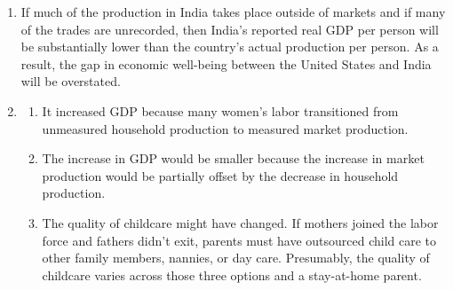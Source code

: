 \documentclass{article}
\begin{document}
\begin{enumerate}
\begin{enumerate}
	\item $100 \left[ \left( \frac{113.6}{78.1} \right)^{\frac{1}{20}} - 1 \right] = 1.89 \%$
	
	\item $\frac{10,287}{\frac{78.1}{100}} = 13,171.57$
	
	\item $\frac{21,141}{\frac{113.5}{100}} = 18,610.04$	
	
	\item $100 \left[ \left( \frac{18610.04}{13171.57} \right)^{\frac{1}{20}} - 1 \right] = 1.74$
	
	\item It must be higher because it also includes growth in prices.
	
	\end{enumerate}
	
\setcounter{enumi}{9}
\item If much of the production in India takes place outside of markets and if many of the trades are unrecorded, then India's reported real GDP per person will be substantially lower than the country's actual production per person. As a result, the gap in economic well-being between the United States and India will be overstated.

\item

	\begin{enumerate}
	
	\item It increased GDP because many women's labor transitioned from unmeasured household production to measured market production.
	
	\item The increase in GDP would be smaller because the increase in market production would be partially offset by the decrease in household production.
	
	\item The quality of childcare might have changed. If mothers joined the labor force and fathers didn't exit, parents must have outsourced child care to other family members, nannies, or day care. Presumably, the quality of childcare varies across those three options and a stay-at-home parent.
	
	\end{enumerate}

\end{enumerate}
\end{document}
